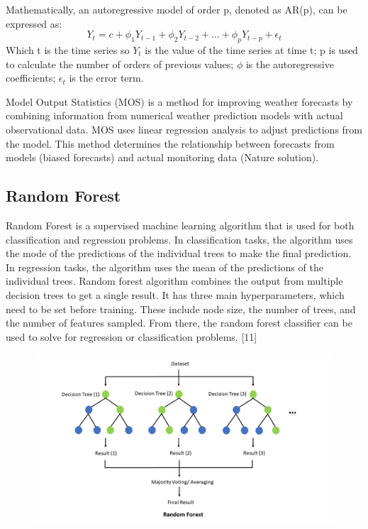 \documentclass{ieeeojies}
\begin{document}
Mathematically, an autoregressive model of order p, denoted as AR(p), can be expressed as:
\[ Y_t = c + \phi_1 Y_{t-1} + \phi_2 Y_{t-2} +...+ \phi_p Y_{t-p} + \epsilon_t\]
Which t is the time series so \(Y_t\) is the value of the time series at time t; p is used to calculate the number of orders of previous values; \(\phi\) is the autoregressive coefficients; \(\epsilon_t\) is the error term.

Model Output Statistics (MOS) is a method for improving weather forecasts by combining information from numerical weather prediction models with actual observational data. MOS uses linear regression analysis to adjust predictions from the model. This method determines the relationship between forecasts from models (biased forecasts) and actual monitoring data (Nature solution).


\subsection{Random Forest}
Random Forest is a supervised machine learning algorithm that is used for both classification and regression problems. In classification tasks, the algorithm uses the mode of the predictions of the individual trees to make the final prediction. In regression tasks, the algorithm uses the mean of the predictions of the individual trees. 
Random forest algorithm combines the output from multiple decision trees to get a single result. It has three main hyperparameters, which need to be set before training. These include node size, the number of trees, and the number of features sampled. From there, the random forest classifier can be used to solve for regression or classification problems. [11] 


\begin{figure}[H]
    \centering
    \begin{minipage}{0.5\textwidth}
        \centering
        \includegraphics[width=1.0\textwidth]{Random Forest.png}
    \end{minipage}
\end{figure}
\end{document}
